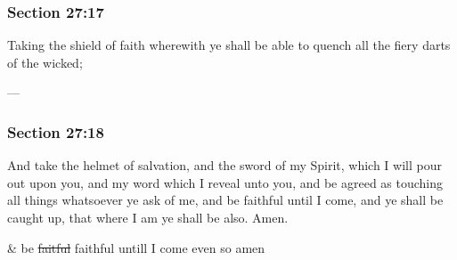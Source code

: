	\subsubsection{Section 27:17} %
		\label{DC27-17}

		Taking the shield of faith wherewith ye shall be able to quench all the fiery darts of the wicked;

		\begin{framed}
		\scriptsize
			\begin{compactdesc}
				\item[JSP] ---
			\end{compactdesc}
		\end{framed}

	\subsubsection{Section 27:18} %
		\label{DC27-18}

		And take the helmet of salvation, and the sword of my Spirit, which I will pour out upon you, and my word which I reveal unto you, and be agreed as touching all things whatsoever ye ask of me, and be faithful until I come, and ye shall be caught up, that where I am ye shall be also.  Amen.

		\begin{framed}
		\scriptsize
			\begin{compactdesc}
				\item[JSP] \& be \sout{faitful} faithful untill I come even so amen
			\end{compactdesc}
		\end{framed}